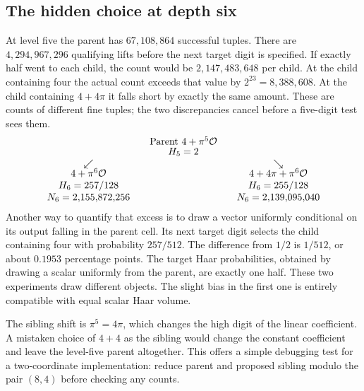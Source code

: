 \documentclass[12pt,letterpaper]{article}
\begin{document}
\subsection{The hidden choice at depth six}
At level five the parent has $67{,}108{,}864$ successful tuples. There are $4{,}294{,}967{,}296$ qualifying lifts before the next target digit is specified. If exactly half went to each child, the count would be $2{,}147{,}483{,}648$ per child. At the child containing four the actual count exceeds that value by $2^{23}=8{,}388{,}608$. At the child containing $4+4\pi$ it falls short by exactly the same amount. These are counts of different fine tuples; the two discrepancies cancel before a five-digit test sees them.
\[
\begin{array}{c@{\qquad}c@{\qquad}c}
 &\text{Parent }4+\pi^5\mathcal O&\\[-2pt]
 & H_5=2&\\
 \swarrow&&\searrow\\[-2pt]
 4+\pi^6\mathcal O&&4+4\pi+\pi^6\mathcal O\\
 H_6=257/128&&H_6=255/128\\
 N_6=2{,}155{,}872{,}256&&N_6=2{,}139{,}095{,}040
\end{array}
\]
Another way to quantify that excess is to draw a vector uniformly conditional on its output falling in the parent cell. Its next target digit selects the child containing four with probability $257/512$. The difference from $1/2$ is $1/512$, or about $0.1953$ percentage points. The target Haar probabilities, obtained by drawing a scalar uniformly from the parent, are exactly one half. These two experiments draw different objects. The slight bias in the first one is entirely compatible with equal scalar Haar volume.
\par
The sibling shift is $\pi^5=4\pi$, which changes the high digit of the linear coefficient. A mistaken choice of $4+4$ as the sibling would change the constant coefficient and leave the level-five parent altogether. This offers a simple debugging test for a two-coordinate implementation: reduce parent and proposed sibling modulo the pair $(8,4)$ before checking any counts.
\end{document}
